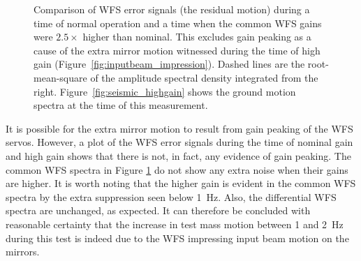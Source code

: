 \begin{figure}
\begin{centering}
\caption[Comparison of WFS error signals (the residual motion) during
a time of normal operation and a time when the common WFS gains were
$2.5\times$ higher than nominal]{Comparison of WFS error signals (the
  residual motion) during a time of normal operation and a time when
  the common WFS gains were $2.5\times$ higher than nominal. This
  excludes gain peaking as a cause of the extra mirror motion
  witnessed during the time of high gain
  (Figure~\ref{fig:inputbeam_impression}). Dashed lines are the
  root-mean-square of the amplitude spectral density integrated from
  the right. Figure~\ref{fig:seismic_highgain} shows the ground motion
  spectra at the time of this measurement.}
\label{fig:WFS_inputbeam}
\end{centering}
\end{figure}

It is possible for the extra mirror motion to result from gain peaking
of the WFS servos. However, a plot of the WFS error signals during the
time of nominal gain and high gain shows that there is not, in fact,
any evidence of gain peaking. The common WFS spectra in
Figure \ref{fig:WFS_inputbeam} do not show any extra noise when their
gains are higher. It is worth noting that the higher gain is evident
in the common WFS spectra by the extra suppression seen below
1~Hz. Also, the differential WFS spectra are unchanged, as
expected. It can therefore be concluded with reasonable certainty that
the increase in test mass motion between 1 and 2~Hz during this test
is indeed due to the WFS impressing input beam motion on the mirrors.




